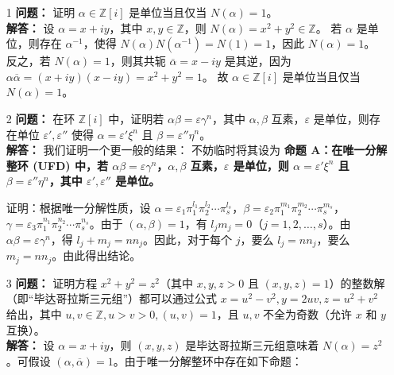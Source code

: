 \documentclass[UTF8]{ctexart}
\begin{document}
\begin{enumerate}

\item[1] 
\textbf{问题：} 证明 \(\alpha \in \mathbb{Z}[i]\) 是单位当且仅当 \(N(\alpha) = 1\)。\\
\textbf{解答：} 设 \(\alpha = x + i y\)，其中 \(x, y \in \mathbb{Z}\)，则 \(N(\alpha) = x^2 + y^2 \in \mathbb{Z}\)。  
若 \(\alpha\) 是单位，则存在 \(\alpha^{-1}\)，使得 \(N(\alpha) N(\alpha^{-1}) = N(1) = 1\)，因此 \(N(\alpha) = 1\)。  
反之，若 \(N(\alpha) = 1\)，则其共轭 \(\overline{\alpha} = x - i y\) 是其逆，因为 \(\alpha \overline{\alpha} = (x + i y)(x - i y) = x^2 + y^2 = 1\)。  
故 \(\alpha \in \mathbb{Z}[i]\) 是单位当且仅当 \(N(\alpha) = 1\)。

\item[2] 
\textbf{问题：} 在环 \(\mathbb{Z}[i]\) 中，证明若 \(\alpha \beta = \varepsilon \gamma^n\)，其中 \(\alpha, \beta\) 互素，\(\varepsilon\) 是单位，则存在单位 \(\varepsilon', \varepsilon''\) 使得 \(\alpha = \varepsilon' \xi^n\) 且 \(\beta = \varepsilon'' \eta^n\)。\\
\textbf{解答：} 我们证明一个更一般的结果： 
不妨临时将其设为
\textbf{命题 A：在唯一分解整环 (UFD) 中，若 \(\alpha \beta = \varepsilon \gamma^n\)，\(\alpha, \beta\) 互素，\(\varepsilon\) 是单位，则 \(\alpha = \varepsilon' \xi^n\) 且 \(\beta = \varepsilon'' \eta^n\)，其中 \(\varepsilon', \varepsilon''\) 是单位。}  

证明：根据唯一分解性质，设 \(\alpha = \varepsilon_1 \pi_1^{l_1} \pi_2^{l_2} \cdots \pi_s^{l_s}\)，\(\beta = \varepsilon_2 \pi_1^{m_1} \pi_2^{m_2} \cdots \pi_s^{m_s}\)，\(\gamma = \varepsilon_3 \pi_1^{n_1} \pi_2^{n_2} \cdots \pi_s^{n_s}\)。由于 \((\alpha, \beta) = 1\)，有 \(l_j m_j = 0\)（\(j = 1, 2, \dots, s\)）。由 \(\alpha \beta = \varepsilon \gamma^n\)，得 \(l_j + m_j = n n_j\)。因此，对于每个 \(j\)，要么 \(l_j = n n_j\)，要么 \(m_j = n n_j\)。由此得出结论。

\item[3] 
\textbf{问题：} 证明方程 \(x^2 + y^2 = z^2\)（其中 \(x, y, z > 0\) 且 \((x, y, z) = 1\)）的整数解（即“毕达哥拉斯三元组”）都可以通过公式 \(x = u^2 - v^2, y = 2uv, z = u^2 + v^2\) 给出，其中 \(u, v \in \mathbb{Z}, u > v > 0, (u, v) = 1\)，且 \(u, v\) 不全为奇数（允许 \(x\) 和 \(y\) 互换）。\\
\textbf{解答：} 设 \(\alpha = x + i y\)，则 \((x, y, z)\) 是毕达哥拉斯三元组意味着 \(N(\alpha) = z^2\)。可假设 \((\alpha, \overline{\alpha}) = 1\)。由于唯一分解整环中存在如下命题：


\end{enumerate}
\end{document}

